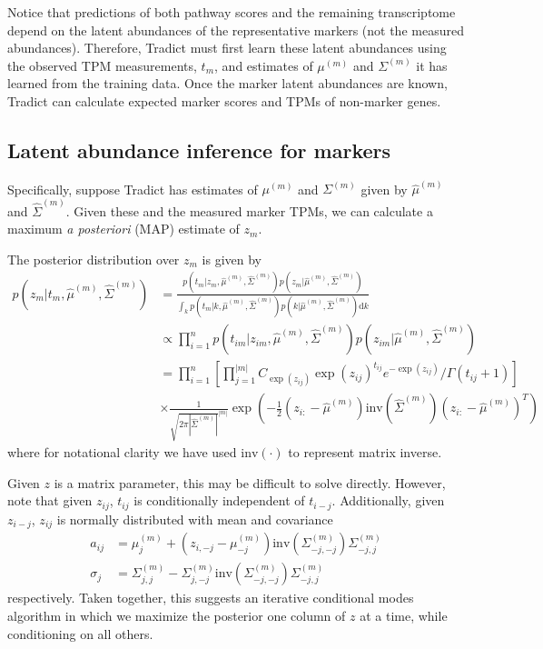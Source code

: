 \documentclass[10pt]{article}
\begin{document}
Notice that predictions of both pathway scores and the remaining transcriptome depend on the latent abundances of the representative markers (not the measured abundances). Therefore, Tradict must first learn these latent abundances using the observed TPM measurements, $t_m$, and estimates of $\mu^{(m)}$ and $\Sigma^{(m)}$ it has learned from the training data. Once the marker latent abundances are known, Tradict can calculate expected marker scores and TPMs of non-marker genes.

\subsection{Latent abundance inference for markers}

 Specifically, suppose Tradict has estimates of $\mu^{(m)}$ and $\Sigma^{(m)}$ given by $\hat{\mu}^{(m)}$ and $\hat{\Sigma}^{(m)}$. Given these and the measured marker TPMs, we can calculate a maximum \emph{a posteriori} (MAP) estimate of $z_m$. 

The posterior distribution over $z_m$ is given by 
\begin{align*}
p(z_m| t_m, \hat{\mu}^{(m)}, \hat{\Sigma}^{(m)}) & =  \frac{p(t_m | z_m, \hat{\mu}^{(m)}, \hat{\Sigma}^{(m)}) p(z_m| \hat{\mu}^{(m)}, \hat{\Sigma}^{(m)}) }{ \int_k  p(t_m | k, \hat{\mu}^{(m)}, \hat{\Sigma}^{(m)}) p(k | \hat{\mu}^{(m)}, \hat{\Sigma}^{(m)}) \textrm{d}k } \\
& \propto \prod_{i=1}^{n}  p(t_{im} | z_{im}, \hat{\mu}^{(m)}, \hat{\Sigma}^{(m)}) p(z_{im}| \hat{\mu}^{(m)}, \hat{\Sigma}^{(m)}) \\
& = \prod_{i=1}^{n} \left[ \prod_{j=1}^{|m|} C_{\exp(z_{ij})} \exp(z_{ij})^{t_{ij}}  e^{-\exp(z_{ij})} / \Gamma(t_{ij} + 1) \right] \\ 
& \times \frac{1}{\sqrt{2\pi|\hat{\Sigma}^{(m)}|}^{|m|}}\exp\left(-\frac{1}{2}(z_{i:}-\hat{\mu}^{(m)}) \textrm{inv}\left( \hat{\Sigma}^{(m)} \right)(z_{i:}-\hat{\mu}^{(m)})^T \right)
\end{align*}
where for notational clarity we have used $\textrm{inv}(\cdot)$ to represent matrix inverse. 

Given $z$ is a matrix parameter, this may be difficult to solve directly. However, note that given $z_{ij}$, $t_{ij}$ is conditionally independent of $t_{i-j}$. Additionally, given $z_{i-j}$, $z_{ij}$ is normally distributed with mean and covariance 
\begin{align*}
a_{ij} & = \mu^{(m)}_j + \left(z_{i,-j} - \mu^{(m)}_{-j} \right)\textrm{inv}\left( \Sigma^{(m)}_{-j,-j} \right) \Sigma^{(m)}_{-j,j} \\
\sigma_j &= \Sigma^{(m)}_{j,j} - \Sigma^{(m)}_{j,-j}\textrm{inv}\left( \Sigma^{(m)}_{-j,-j} \right) \Sigma^{(m)}_{-j,j}
\end{align*}
respectively. Taken together, this suggests an iterative conditional modes algorithm in which we maximize the posterior one column of $z$ at a time, while conditioning on all others. 
\end{document}
